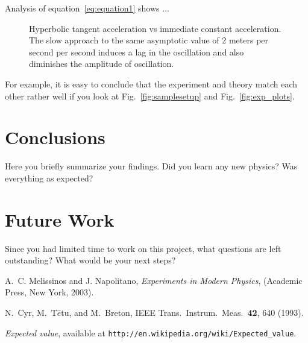 \documentclass[letterpaper,12pt]{article}
\begin{document}
Analysis of equation~\ref{eq:equation1} shows ...

\blindtext

\begin{figure}
    \centering
    \caption{Hyperbolic tangent acceleration vs immediate constant acceleration. The slow approach to the same asymptotic value of 2 meters per second per second induces a lag in the oscillation and also diminishes the amplitude of oscillation.}
\end{figure}

For example, it is easy to conclude that the
experiment and theory match each other rather well if you look at
Fig.~\ref{fig:samplesetup} and Fig.~\ref{fig:exp_plots}.


\section{Conclusions}
Here you briefly summarize your findings. Did you learn any new physics? Was everything as expected?

\blindtext

\section{Future Work}
Since you had limited time to work on this project, what questions are left outstanding? What would be your next steps? 

\blindtext


\begin{thebibliography}{99}

A.~C. Melissinos and J. Napolitano, \textit{Experiments in Modern Physics},
(Academic Press, New York, 2003).

N.\ Cyr, M.\ T$\hat{e}$tu, and M.\ Breton,
IEEE Trans.\ Instrum.\ Meas.\ \textbf{42}, 640 (1993).

 \emph{Expected value},  available at
\texttt{http://en.wikipedia.org/wiki/Expected\_value}.

\end{thebibliography}
\end{document}

